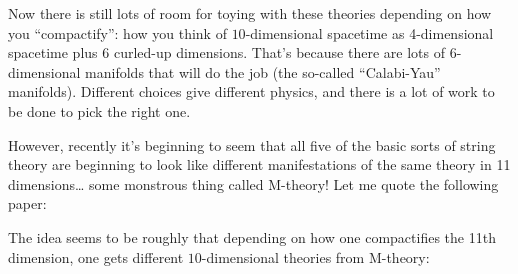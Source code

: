 \documentclass{article}
\def\tightlist{}
\renewcommand{\texttt}[1]{%
  \begingroup
  \ttfamily
  \begingroup\lccode`~=`/\lowercase{\endgroup\def~}{/\discretionary{}{}{}}%
  \begingroup\lccode`~=`[\lowercase{\endgroup\def~}{[\discretionary{}{}{}}%
  \begingroup\lccode`~=`.\lowercase{\endgroup\def~}{.\discretionary{}{}{}}%
  \catcode`/=\active\catcode`[=\active\catcode`.=\active
  \scantokens{#1\noexpand}%
  \endgroup
}
\begin{document}
Now there is still lots of room for toying with these theories depending
on how you ``compactify'': how you think of \(10\)-dimensional spacetime
as 4-dimensional spacetime plus 6 curled-up dimensions. That's because
there are lots of \(6\)-dimensional manifolds that will do the job (the
so-called ``Calabi-Yau'' manifolds). Different choices give different
physics, and there is a lot of work to be done to pick the right one.

However, recently it's beginning to seem that all five of the basic
sorts of string theory are beginning to look like different
manifestations of the same theory in 11 dimensions\ldots{} some
monstrous thing called M-theory! Let me quote the following paper:


The idea seems to be roughly that depending on how one compactifies the
11th dimension, one gets different \(10\)-dimensional theories from
M-theory:
\end{document}
